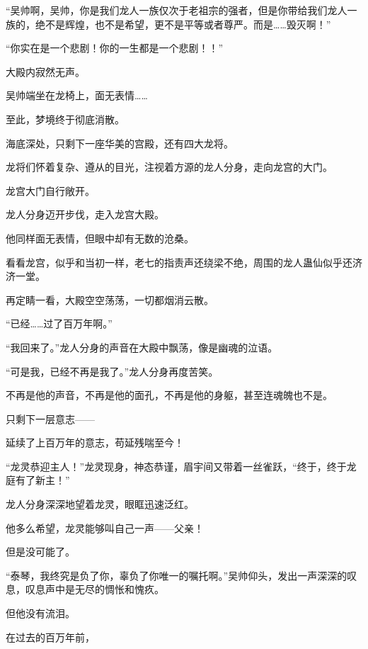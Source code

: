 \begin{this_body}
“吴帅啊，吴帅，你是我们龙人一族仅次于老祖宗的强者，但是你带给我们龙人一族的，绝不是辉煌，也不是希望，更不是平等或者尊严。而是……毁灭啊！”

“你实在是一个悲剧！你的一生都是一个悲剧！！”

大殿内寂然无声。

吴帅端坐在龙椅上，面无表情……

至此，梦境终于彻底消散。

海底深处，只剩下一座华美的宫殿，还有四大龙将。

龙将们怀着复杂、遵从的目光，注视着方源的龙人分身，走向龙宫的大门。

龙宫大门自行敞开。

龙人分身迈开步伐，走入龙宫大殿。

他同样面无表情，但眼中却有无数的沧桑。

看看龙宫，似乎和当初一样，老七的指责声还绕梁不绝，周围的龙人蛊仙似乎还济济一堂。

再定睛一看，大殿空空荡荡，一切都烟消云散。

“已经……过了百万年啊。”

“我回来了。”龙人分身的声音在大殿中飘荡，像是幽魂的泣语。

“可是我，已经不再是我了。”龙人分身再度苦笑。

不再是他的声音，不再是他的面孔，不再是他的身躯，甚至连魂魄也不是。

只剩下一层意志——

延续了上百万年的意志，苟延残喘至今！

“龙灵恭迎主人！”龙灵现身，神态恭谨，眉宇间又带着一丝雀跃，“终于，终于龙庭有了新主！”

龙人分身深深地望着龙灵，眼眶迅速泛红。

他多么希望，龙灵能够叫自己一声——父亲！

但是没可能了。

“泰琴，我终究是负了你，辜负了你唯一的嘱托啊。”吴帅仰头，发出一声深深的叹息，叹息声中是无尽的惆怅和愧疚。

但他没有流泪。

在过去的百万年前，

\end{this_body}

